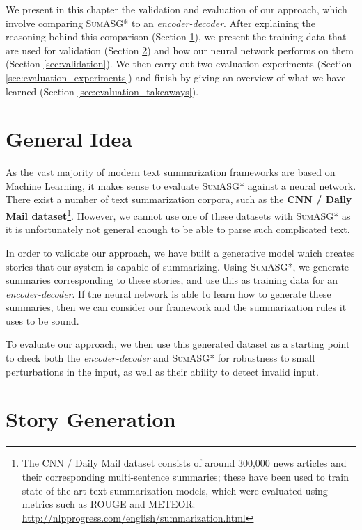 \label{chapter:evaluation}

We present in this chapter the validation and evaluation of our approach, which involve comparing \textsc{SumASG*} to an \textit{encoder-decoder}. After explaining the reasoning behind this comparison (Section \ref{sec:evaluation_general_idea}), we present the training data that are used for validation (Section \ref{sec:story_generation}) and how our neural network performs on them (Section \ref{sec:validation}). We then carry out two evaluation experiments (Section \ref{sec:evaluation_experiments}) and finish by giving an overview of what we have learned (Section \ref{sec:evaluation_takeaways}).

\section{General Idea}
\label{sec:evaluation_general_idea}

As the vast majority of modern text summarization frameworks are based on Machine Learning, it makes sense to evaluate \textsc{SumASG*} against a neural network. There exist a number of text summarization corpora, such as the \textbf{CNN / Daily Mail dataset}\footnote{The CNN / Daily Mail dataset consists of around 300,000 news articles and their corresponding multi-sentence summaries; these have been used to train state-of-the-art text summarization models, which were evaluated using metrics such as ROUGE and METEOR: \url{http://nlpprogress.com/english/summarization.html}}. However, we cannot use one of these datasets with \textsc{SumASG*} as it is unfortunately not general enough to be able to parse such complicated text.

In order to validate our approach, we have built a generative model which creates stories that our system is capable of summarizing. Using \textsc{SumASG*}, we generate summaries corresponding to these stories, and use this as training data for an \textit{encoder-decoder}. If the neural network is able to learn how to generate these summaries, then we can consider our framework and the summarization rules it uses to be sound.

To evaluate our approach, we then use this generated dataset as a starting point to check both the \textit{encoder-decoder} and \textsc{SumASG*} for robustness to small perturbations in the input, as well as their ability to detect invalid input.

\section{Story Generation}
\label{sec:story_generation}

